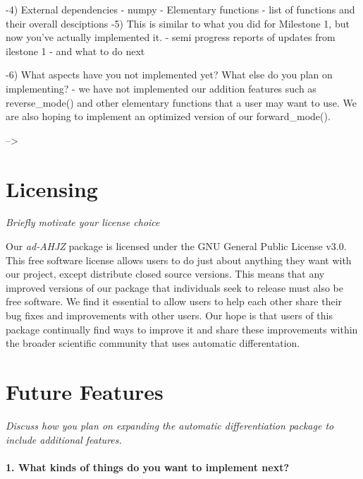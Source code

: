 \documentclass[11pt]{article}
\begin{document}
-4) External dependencies - numpy - Elementary functions - list of
functions and their overall desciptions -5) This is similar to what you
did for Milestone 1, but now you've actually implemented it. - semi
progress reports of updates from ilestone 1 - and what to do next

-6) What aspects have you not implemented yet? What else do you plan on
implementing? - we have not implemented our addition features such as
reverse\_mode() and other elementary functions that a user may want to
use. We are also hoping to implement an optimized version of our
forward\_mode().

--\textgreater{}

    \hypertarget{licensing}{%
\section{Licensing}\label{licensing}}

    \emph{Briefly motivate your license choice}

Our \emph{ad-AHJZ} package is licensed under the GNU General Public
License v3.0. This free software license allows users to do just about
anything they want with our project, except distribute closed source
versions. This means that any improved versions of our package that
individuals seek to release must also be free software. We find it
essential to allow users to help each other share their bug fixes and
improvements with other users. Our hope is that users of this package
continually find ways to improve it and share these improvements within
the broader scientific community that uses automatic differentation.

    \hypertarget{future-features}{%
\section{Future Features}\label{future-features}}

    \emph{Discuss how you plan on expanding the automatic differentiation
package to include additional features.}

\hypertarget{what-kinds-of-things-do-you-want-to-implement-next}{%
\paragraph{1. What kinds of things do you want to implement
next?}\label{what-kinds-of-things-do-you-want-to-implement-next}}
\end{document}
